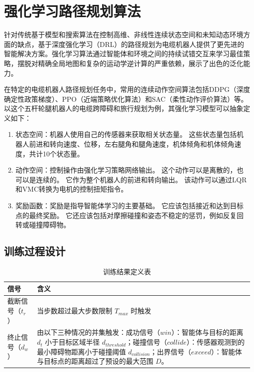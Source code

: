\section{强化学习路径规划算法}

针对传统基于模型和搜索算法在控制高维、非线性连续状态空间和未知动态环境方面的缺点，基于深度强化学习（DRL）的路径规划为电缆机器人提供了更先进的智能解决方案。\cite{tai2016deep}强化学习算法通过智能体和环境之间的持续试错交互来学习最佳策略，摆脱对精确全局地图和复杂的运动学逆计算的严重依赖，展示了出色的泛化能力。

在特定的电缆机器人路径规划任务中，常用的连续动作空间算法包括DDPG（深度确定性政策梯度）、PPO（近端策略优化算法）和SAC（柔性动作评价算法）等。以这个五杆轮腿机器人的电缆跨障碍和旅行规划为例，其强化学习模型可以抽象定义如下：
\begin{enumerate}

\item 状态空间：机器人使用自己的传感器来获取相关状态量。 这些状态量包括机器人前进和转向速度、位移，左右腿角和腿角速度，机体倾角和机体倾角速度，共计10个状态量。

\item 动作空间：控制操作由强化学习策略网络输出。 这个动作可以是离散的，也可以是连续的。 它作为整个机器人的前进和转向输出。 该动作可以通过LQR和VMC转换为电机的控制扭矩指令。

\item 奖励函数：奖励是指导智能体学习的主要基础。 它应该包括接近和达到目标点的最终奖励。 它还应该包括对摩擦碰撞和姿态不稳定的惩罚，例如反复回转或碰撞障碍物。
\end{enumerate}

\subsection{训练过程设计}

\begin{table}[!htbp]
  \centering
  \caption{训练结果定义表}\label{tab:training_definition}
  \renewcommand{\arraystretch}{1.3}
    \begin{tabular}{lp{}}
    \toprule
    \textbf{信号} & \textbf{含义}  \\
    \midrule
    截断信号（$t_r$）& 当步数超过最大步数限制 $T_{max}$ 时触发  \\
        终止信号（$d_w$）& 由以下三种情况的并集触发：成功信号（$win$）：智能体与目标的距离 $d_t$ 小于目标区域半径 $d_{threshold}$；碰撞信号（$collide$）：传感器观测到的最小障碍物距离小于碰撞阈值 $d_{collision}$；出界信号（$exceed$）：智能体与目标点的距离超过了预设的最大范围 $D$。\\
    \bottomrule
  \end{tabular}
\end{table}
\raggedbottom

